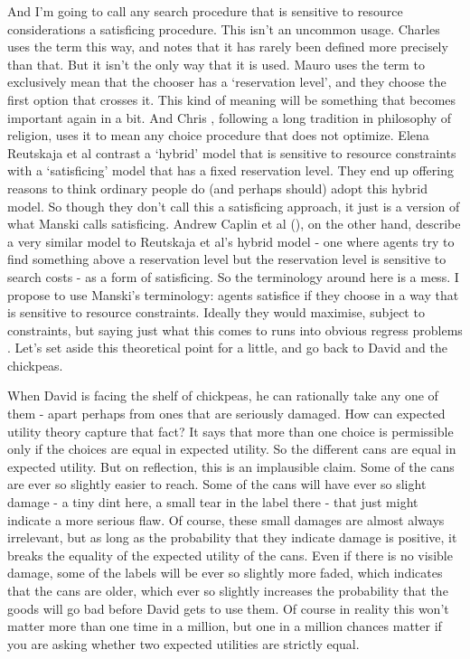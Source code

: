 \documentclass[11pt,]{book}
\begin{document}
And I'm going to call any search procedure that is sensitive to resource considerations a satisficing procedure. This isn't an uncommon usage. Charles \citet{Manski2017} uses the term this way, and notes that it has rarely been defined more precisely than that. But it isn't the only way that it is used. Mauro \citet{Papi2013} uses the term to exclusively mean that the chooser has a `reservation level', and they choose the first option that crosses it. This kind of meaning will be something that becomes important again in a bit. And Chris \citet{Tucker2016}, following a long tradition in philosophy of religion, uses it to mean any choice procedure that does not optimize. Elena Reutskaja et al \citeyearpar{Reutskaja2011} contrast a `hybrid' model that is sensitive to resource constraints with a `satisficing' model that has a fixed reservation level. They end up offering reasons to think ordinary people do (and perhaps should) adopt this hybrid model. So though they don't call this a satisficing approach, it just is a version of what Manski calls satisficing. Andrew Caplin et al (\citeyearpar{Caplin2011}), on the other hand, describe a very similar model to Reutskaja et al's hybrid model - one where agents try to find something above a reservation level but the reservation level is sensitive to search costs - as a form of satisficing. So the terminology around here is a mess. I propose to use Manski's terminology: agents satisfice if they choose in a way that is sensitive to resource constraints. Ideally they would maximise, subject to constraints, but saying just what this comes to runs into obvious regress problems \citep{Savage1967}. Let's set aside this theoretical point for a little, and go back to David and the chickpeas.

When David is facing the shelf of chickpeas, he can rationally take any one of them - apart perhaps from ones that are seriously damaged. How can expected utility theory capture that fact? It says that more than one choice is permissible only if the choices are equal in expected utility. So the different cans are equal in expected utility. But on reflection, this is an implausible claim. Some of the cans are ever so slightly easier to reach. Some of the cans will have ever so slight damage - a tiny dint here, a small tear in the label there - that just might indicate a more serious flaw. Of course, these small damages are almost always irrelevant, but as long as the probability that they indicate damage is positive, it breaks the equality of the expected utility of the cans. Even if there is no visible damage, some of the labels will be ever so slightly more faded, which indicates that the cans are older, which ever so slightly increases the probability that the goods will go bad before David gets to use them. Of course in reality this won't matter more than one time in a million, but one in a million chances matter if you are asking whether two expected utilities are strictly equal.
\end{document}
